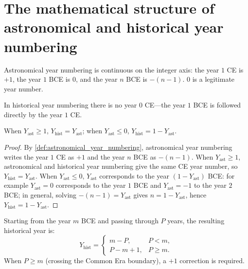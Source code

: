 \section{The mathematical structure of astronomical and historical year numbering}
\label{sec:calendar_year_numbering}

\begin{definition}\label{def:astronomical_year_numbering}
Astronomical year numbering is continuous on the integer axis: the year \(1\) CE is \(+1\), the year \(1\) BCE is \(0\), and the year \(n\) BCE is \(-(n-1)\). \(0\) is a legitimate year number.
\end{definition}

\begin{definition}\label{def:historical_year_numbering}
In historical year numbering there is no year \(0\) CE---the year \(1\) BCE is followed directly by the year \(1\) CE.
\end{definition}

\begin{proposition}\label{prop:year_conversion}
When \(Y_{\text{ast}}\ge 1\), \(Y_{\text{hist}}=Y_{\text{ast}}\); when \(Y_{\text{ast}}\le 0\), \(Y_{\text{hist}}=1-Y_{\text{ast}}\).
\end{proposition}

\begin{proof}
By \cref{def:astronomical_year_numbering}, astronomical year numbering writes the year \(1\) CE as \(+1\) and the year \(n\) BCE as \(-(n-1)\). When \(Y_{\text{ast}}\ge 1\), astronomical and historical year numbering give the same CE year number, so \(Y_{\text{hist}}=Y_{\text{ast}}\). When \(Y_{\text{ast}}\le 0\), \(Y_{\text{ast}}\) corresponds to the year \((1-Y_{\text{ast}})\) BCE: for example \(Y_{\text{ast}}=0\) corresponds to the year \(1\) BCE and \(Y_{\text{ast}}=-1\) to the year \(2\) BCE; in general, solving \(-(n-1)=Y_{\text{ast}}\) gives \(n=1-Y_{\text{ast}}\), hence \(Y_{\text{hist}}=1-Y_{\text{ast}}\).
\end{proof}

\begin{theorem}\label{thm:cross_era_correction}
Starting from the year \(m\) BCE and passing through \(P\) years, the resulting historical year is:
\[
Y_{\text{hist}}=\begin{cases}
m-P, & P<m,\\
P-m+1, & P\ge m.
\end{cases}
\]
When \(P\ge m\) (crossing the Common Era boundary), a \(+1\) correction is required.
\end{theorem}

